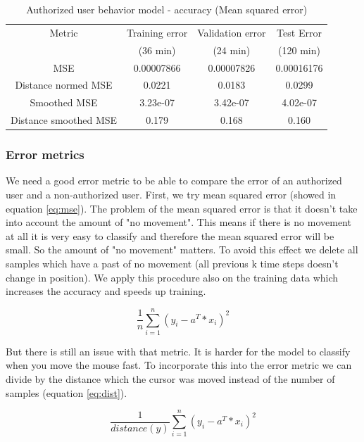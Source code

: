 \documentclass[conference]{IEEEtran}
\begin{document}
\begin{table}[!t]
\renewcommand{\arraystretch}{1.3}
\caption{Authorized user behavior model - accuracy (Mean squared error)}
\label{table_model_quality}
\centering
\begin{tabular}{|c||c|c|c|}
\hline
Metric & Training error & Validation error & Test Error\\
 & (36 min) & (24 min) & (120 min)\\
\hline
MSE & 0.00007866 & 0.00007826 & 0.00016176\\
\hline
Distance normed MSE & 0.0221 & 0.0183 & 0.0299\\
\hline
Smoothed MSE & 3.23e-07 & 3.42e-07 & 4.02e-07\\
\hline
Distance smoothed MSE & 0.179 & 0.168 & 0.160\\
\hline
\end{tabular}
\end{table}


\subsubsection{Error metrics}
We need a good error metric to be able to compare the error of an authorized user and a non-authorized user. First, we try mean squared error (showed in equation \ref{eq:mse}). The problem of the mean squared error is that it doesn't take into account the amount of "no movement". This means if there is no movement at all it is very easy to classify and therefore the mean squared error will be small. So the amount of "no movement" matters. To avoid this effect we delete all samples which have a past of no movement (all previous k time steps doesn't change in position). We apply this procedure also on the training data which increases the accuracy and speeds up training.

\begin{equation}
\label{eq:mse}
\frac{1}{n} \sum_{i=1}^{n}  (y_{i} - a^T*x_{i})^2
\end{equation}

But there is still an issue with that metric. It is harder for the model to classify when you move the mouse fast. To incorporate this into the error metric we can divide by the distance which the cursor was moved instead of the number of samples (equation \ref{eq:dist}).

\begin{equation}
\label{eq:dist}
\frac{1}{distance(y)} \sum_{i=1}^{n}  (y_{i} - a^T*x_{i})^2
\end{equation}
\end{document}
